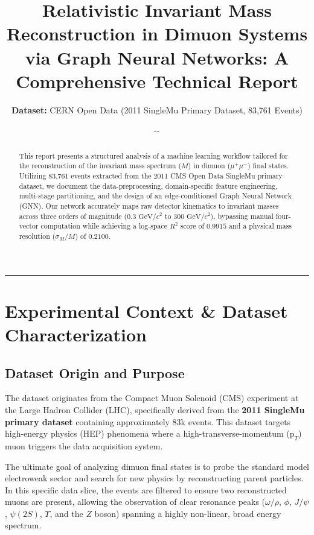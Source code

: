 \documentclass[11pt,a4paper]{article}
\title{\textbf{Relativistic Invariant Mass Reconstruction in Dimuon Systems via Graph Neural Networks: A Comprehensive Technical Report}}
\author{\textbf{Dataset:} CERN Open Data (2011 SingleMu Primary Dataset, 83,761 Events)}
\date{\number\year-\number\month-\number\day}
\begin{document}
\pagestyle{empty}


\maketitle
\thispagestyle{empty}
\begin{abstract}
This report presents a structured analysis of a machine learning workflow tailored for the reconstruction of the invariant mass spectrum ($M$) in dimuon ($\mu^+\mu^-$) final states. Utilizing 83,761 events extracted from the 2011 CMS Open Data SingleMu primary dataset, we document the data-preprocessing, domain-specific feature engineering, multi-stage partitioning, and the design of an edge-conditioned Graph Neural Network (GNN). Our network accurately maps raw detector kinematics to invariant masses across three orders of magnitude ($0.3\text{ GeV}/c^2$ to $300\text{ GeV}/c^2$), bypassing manual four-vector computation while achieving a log-space $R^2$ score of $0.9915$ and a physical mass resolution ($\sigma_M/M$) of $0.2100$.
\end{abstract}

\hrule
\vspace{0.5cm}

\section{Experimental Context \& Dataset Characterization}

\subsection{Dataset Origin and Purpose}

The dataset originates from the Compact Muon Solenoid (CMS) experiment at the Large Hadron Collider (LHC), specifically derived from the \textbf{2011 SingleMu primary dataset} containing approximately 83k events. This dataset targets high-energy physics (HEP) phenomena where a high-transverse-momentum ($\text{p}_T$) muon triggers the data acquisition system.

The ultimate goal of analyzing dimuon final states is to probe the standard model electroweak sector and search for new physics by reconstructing parent particles. In this specific data slice, the events are filtered to ensure two reconstructed muons are present, allowing the observation of clear resonance peaks ($\omega/\rho$, $\phi$, $J/\psi$, $\psi(2S)$, $\Upsilon$, and the $Z$ boson) spanning a highly non-linear, broad energy spectrum.
\end{document}
